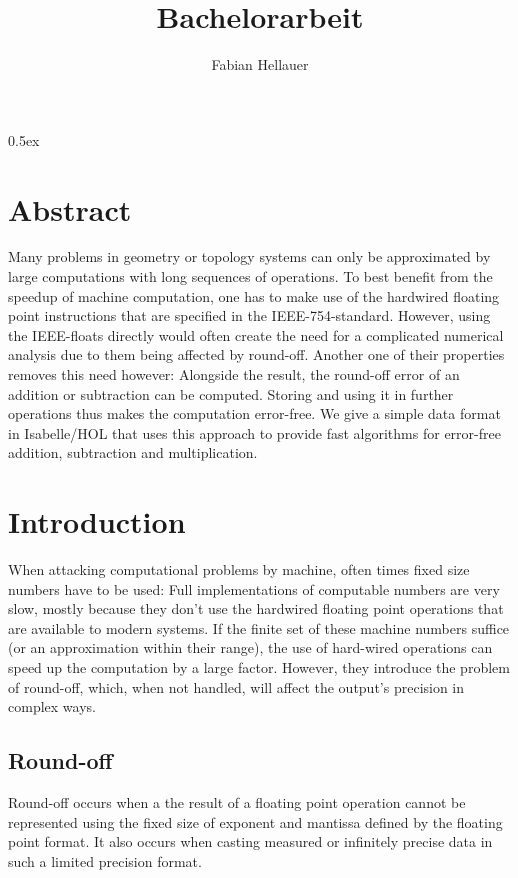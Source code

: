 \documentclass[11pt,a4paper]{article}
\begin{document}
\title{Bachelorarbeit}
\author{Fabian Hellauer}
\maketitle

\tableofcontents

\parindent 0pt\parskip 0.5ex

\section{Abstract}

Many problems in geometry or topology systems can only be approximated by large computations with long sequences of operations. To best benefit from the speedup of machine computation, one has to make use of the hardwired floating point instructions that are specified in the IEEE-754-standard. However, using the IEEE-floats directly would often create the need for a complicated numerical analysis due to them being affected by round-off.
Another one of their properties removes this need however: Alongside the result, the round-off error of an addition or subtraction can be computed. Storing and using it in further operations thus makes the computation error-free.
We give a simple data format in Isabelle/HOL that uses this approach to provide fast algorithms for error-free addition, subtraction and multiplication.

\section{Introduction}

When attacking computational problems by machine, often times fixed size numbers have to be used: Full implementations of computable numbers are very slow, mostly because they don't use the hardwired floating point operations that are available to modern systems. If the finite set of these machine numbers suffice (or an approximation within their range), the use of hard-wired operations can speed up the computation by a large factor. However, they introduce the problem of round-off, which, when not handled, will affect the output's precision in complex ways.

\subsection{Round-off}
Round-off occurs when a the result of a floating point operation cannot be represented using the fixed size of exponent and mantissa defined by the floating point format. It also occurs when casting measured or infinitely precise data in such a limited precision format.
\end{document}
